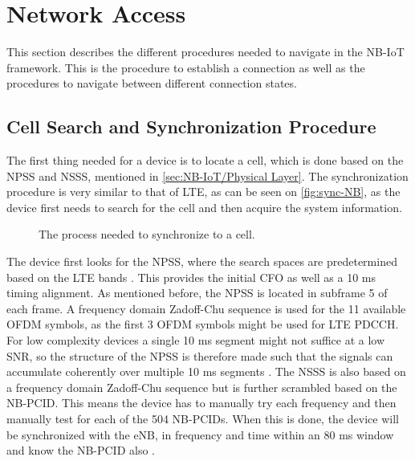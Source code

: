 




\section{Network Access}
\label{sec:Network_access}
This section describes the different procedures needed to navigate in the NB-IoT framework. This is the procedure to establish a connection as well as the procedures to navigate between different connection states. 

\subsection{Cell Search and Synchronization Procedure}
\label{sec:cellsync}
The first thing needed for a device is to locate a cell, which is done based on the NPSS and NSSS, mentioned in \autoref{sec:NB-IoT/Physical Layer}. The synchronization procedure is very similar to that of \gls{LTE}, as can be seen on \autoref{fig:sync-NB}, as the device first needs to search for the cell and then acquire the system information. 


\begin{figure}[H]
\centering

\caption{The process needed to synchronize to a cell.}
\label{fig:sync-NB}
\end{figure}

The device first looks for the \gls{NPSS}, where the search spaces are predetermined based on the LTE bands \citep{whitepaper}. This provides the initial \gls{CFO} as well as a 10 ms timing alignment. As mentioned before, the NPSS is located in subframe 5 of each frame. A frequency domain Zadoff-Chu sequence is used for the 11 available \gls{OFDM} symbols, as the first 3 OFDM symbols might be used for LTE PDCCH. For low complexity devices a single 10 ms segment might not suffice at a low \gls{SNR}, so the structure of the \gls{NPSS} is therefore made such that the signals can accumulate coherently over multiple 10 ms segments \citep{NB-IoT_Book,primer}. The \gls{NSSS} is also based on a frequency domain Zadoff-Chu sequence but is further scrambled based on the \gls{NB-PCID}. This means the device has to manually try each frequency and then manually test for each of the 504 NB-PCIDs. When this is done, the device will be synchronized with the eNB, in frequency and time within an 80 ms window and know the NB-PCID also \citep{NB-IoT_Book,primer}. 

